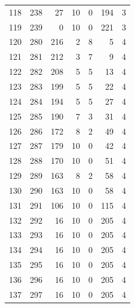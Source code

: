 \documentclass[a4paper,twoside,12pt]{book}
\begin{document}
\begin{appendices}
\begin{table}
\begin{tabular}{lrrrrrr}
		118 &    238 &        27 &        10 &               0 &             194 &         3 \\
		119 &    239 &         0 &        10 &               0 &             221 &         3 \\
		120 &    280 &       216 &         2 &               8 &               5 &         4 \\
		121 &    281 &       212 &         3 &               7 &               9 &         4 \\
		122 &    282 &       208 &         5 &               5 &              13 &         4 \\
		123 &    283 &       199 &         5 &               5 &              22 &         4 \\
		124 &    284 &       194 &         5 &               5 &              27 &         4 \\
		125 &    285 &       190 &         7 &               3 &              31 &         4 \\
		126 &    286 &       172 &         8 &               2 &              49 &         4 \\
		127 &    287 &       179 &        10 &               0 &              42 &         4 \\
		128 &    288 &       170 &        10 &               0 &              51 &         4 \\
		129 &    289 &       163 &         8 &               2 &              58 &         4 \\
		130 &    290 &       163 &        10 &               0 &              58 &         4 \\
		131 &    291 &       106 &        10 &               0 &             115 &         4 \\
		132 &    292 &        16 &        10 &               0 &             205 &         4 \\
		133 &    293 &        16 &        10 &               0 &             205 &         4 \\
		134 &    294 &        16 &        10 &               0 &             205 &         4 \\
		135 &    295 &        16 &        10 &               0 &             205 &         4 \\
		136 &    296 &        16 &        10 &               0 &             205 &         4 \\
		137 &    297 &        16 &        10 &               0 &             205 &         4 \\

\end{tabular}
\end{table}
\end{appendices}
\end{document}
